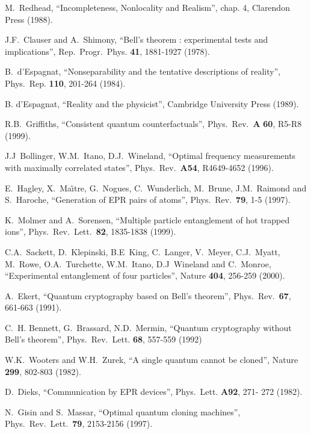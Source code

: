 \documentclass[12pt,onecolumn]{article}%
\begin{document}
\begin{thebibliography}{999}
M.\ Redhead, ``Incompleteness, Nonlocality and Realism'',
chap. 4, Clarendon Press (1988).

J.F.\ Clauser and A.\ Shimony, ``Bell's theorem : experimental
tests and implications'', Rep.\ Progr.\ Phys. \textbf{41}, 1881-1927 (1978).

B.\ d'Espagnat, ``Nonseparability and the tentative
descriptions of reality'', Phys.\ Rep. \textbf{110}, 201-264 (1984).

B. d'Espagnat, ``Reality and the physicist'', Cambridge
University Press (1989).

R.B.\ Griffiths, ``Consistent quantum counterfactuals'',
Phys.\ Rev.\ \textbf{A} \textbf{60}, R5-R8 (1999).

J.J\ Bollinger, W.M.\ Itano, D.J.\ Wineland, ``Optimal
frequency measurements with maximally correlated states'',
Phys.\ Rev.\ \textbf{A54}, R4649-4652 (1996).

E.\ Hagley, X.\ Ma\^{\i}tre, G.\ Nogues, C.\ Wunderlich,
M.\ Brune, J.M.\ Raimond and S.\ Haroche, ``Generation of EPR pairs of
atoms'', Phys.\ Rev.\ \textbf{79}, 1-5 (1997).

K.\ Molmer and A.\ Sorensen, ``Multiple particle entanglement
of hot trapped ions'', Phys.\ Rev.\ Lett.\ \textbf{82}, 1835-1838 (1999).

C.A.\ Sackett, D.\ Klepinski, B.E\ King, C.\ Langer,
V.\ Meyer, C.J.\ Myatt, M.\ Rowe, O.A.\ Turchette, W.M.\ Itano, D.J\ Wineland
and C.\ Monroe, ``Experimental entanglement of four particles'', Nature
\textbf{404}, 256-259 (2000).

A.\ Ekert, ``Quantum cryptography based on Bell's theorem'',
Phys.\ Rev.\ \textbf{67}, 661-663 (1991).

C.\ H. Bennett, G.\ Brassard, N.D.\ Mermin, ``Quantum
cryptography without Bell's theorem'', Phys.\ Rev.\ Lett. \textbf{68}, 557-559 (1992)

W.K.\ Wooters and W.H.\ Zurek, ``A single quantum
cannot be cloned'', Nature \textbf{299}, 802-803 (1982).

D.\ Dieks, ``Communication by EPR devices'', Phys.\ Lett.
\textbf{A92}, 271- 272 (1982).

N.\ Gisin and S.\ Massar, ``Optimal quantum cloning
machines'', Phys.\ Rev.\ Lett.\ \textbf{79}, 2153-2156 (1997).


\end{thebibliography}
\end{document}
